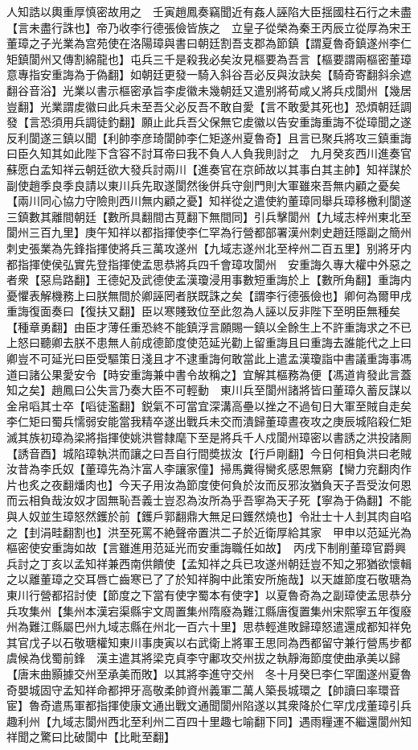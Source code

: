 人知誥以輿重厚慎密故用之　壬寅趙鳳奏竊聞近有姦人誣陷大臣揺國柱石行之未盡【言未盡行誅也】帝乃收李行德張儉皆族之　立皇子從榮為秦王丙辰立從厚為宋王　董璋之子光業為宫苑使在洛陽璋與書曰朝廷割吾支郡為節鎮【謂夏魯奇鎮遂州李仁矩鎮閬州又傳割綿龍也】屯兵三千是殺我必矣汝見樞要為吾言【樞要謂兩樞密董璋意專指安重誨為于偽翻】如朝廷更發一騎入斜谷吾必反與汝訣矣【騎奇寄翻斜余遮翻谷音浴】光業以書示樞密承旨李䖍徽未幾朝廷又遣别將荀咸乂將兵戍閬州【幾居豈翻】光業謂䖍徽曰此兵未至吾父必反吾不敢自愛【言不敢愛其死也】恐煩朝廷調發【言恐須用兵調徒釣翻】願止此兵吾父保無它䖍徽以告安重誨重誨不從璋聞之遂反利閬遂三鎮以聞【利帥李彦琦閬帥李仁矩遂州夏魯奇】且言已聚兵將攻三鎮重誨曰臣久知其如此陛下含容不討耳帝曰我不負人人負我則討之　九月癸亥西川進奏官蘇愿白孟知祥云朝廷欲大發兵討兩川【進奏官在京師故以其事白其主帥】知祥謀於副使趙季良季良請以東川兵先取遂閬然後併兵守劍門則大軍雖來吾無内顧之憂矣【兩川同心協力守險則西川無内顧之憂】知祥從之遣使約董璋同舉兵璋移檄利閬遂三鎮數其離間朝廷【數所具翻間古莧翻下無間同】引兵擊閬州【九域志梓州東北至閬州三百九里】庚午知祥以都指揮使李仁罕為行營都部署漢州刺史趙廷隱副之簡州刺史張業為先鋒指揮使將兵三萬攻遂州【九域志遂州北至梓州二百五里】别將牙内都指揮使侯弘實先登指揮使孟思恭將兵四千會璋攻閬州　安重誨久專大權中外惡之者衆【惡烏路翻】王德妃及武德使孟漢瓊浸用事數短重誨於上【數所角翻】重誨内憂懼表解機務上曰朕無間於卿誣罔者朕既誅之矣【謂李行德張儉也】卿何為爾甲戌重誨復面奏曰【復扶又翻】臣以寒賤致位至此忽為人誣以反非陛下至明臣無種矣【種章勇翻】由臣才薄任重恐終不能鎮浮言願賜一鎮以全餘生上不許重誨求之不已上怒曰聽卿去朕不患無人前成德節度使范延光勸上留重誨且曰重誨去誰能代之上曰卿豈不可延光曰臣受驅策日淺且才不逮重誨何敢當此上遣孟漢瓊詣中書議重誨事馮道曰諸公果愛安令【時安重誨兼中書令故稱之】宜解其樞務為便【馮道肯發此言蓋知之矣】趙鳳曰公失言乃奏大臣不可輕動　東川兵至閬州諸將皆曰董璋久蓄反謀以金帛㗖其士卒【㗖徒濫翻】鋭氣不可當宜深溝高壘以挫之不過旬日大軍至賊自走矣李仁矩曰蜀兵懦弱安能當我精卒遂出戰兵未交而潰歸董璋晝夜攻之庚辰城陷殺仁矩滅其族初璋為梁將指揮使姚洪嘗隸麾下至是將兵千人戍閬州璋密以書誘之洪投諸厠【誘音酉】城陷璋執洪而讓之曰吾自行間奬拔汝【行戶剛翻】今日何相負洪曰老賊汝昔為李氏奴【董璋先為汴富人李讓家僮】掃馬糞得臠炙感恩無窮【臠力兖翻肉作片也炙之夜翻燔肉也】今天子用汝為節度使何負於汝而反邪汝猶負天子吾受汝何恩而云相負哉汝奴才固無恥吾義士豈忍為汝所為乎吾寧為天子死【寧為于偽翻】不能與人奴並生璋怒然鑊於前【鑊戶郭翻鼎大無足曰鑊然燒也】令壯士十人刲其肉自啗之【刲涓畦翻割也】洪至死罵不絶聲帝置洪二子於近衛厚給其家　甲申以范延光為樞密使安重誨如故【言雖進用范延光而安重誨職任如故】　丙戌下制削董璋官爵興兵討之丁亥以孟知祥兼西南供饋使【孟知祥之兵已攻遂州朝廷豈不知之邪猶欲懷輯之以離董璋之交耳唇亡齒寒已了了於知祥胸中此策安所施哉】以天雄節度石敬瑭為東川行營都招討使【節度之下當有使字蜀本有使字】以夏魯奇為之副璋使孟思恭分兵攻集州【集州本漢宕渠縣宇文周置集州隋廢為難江縣唐復置集州宋熙寧五年復廢州為難江縣屬巴州九域志縣在州北一百六十里】思恭輕進敗歸璋怒遣還成都知祥免其官戊子以石敬瑭權知東川事庚寅以右武衛上將軍王思同為西都留守兼行營馬步都虞候為伐蜀前鋒　漢主遣其將梁克貞李守鄘攻交州拔之執靜海節度使曲承美以歸【唐末曲顥據交州至承美而敗】以其將李進守交州　冬十月癸巳李仁罕圍遂州夏魯奇嬰城固守孟知祥命都押牙高敬柔帥資州義軍二萬人築長城環之【帥讀曰率環音宦】魯奇遣馬軍都指揮使康文通出戰文通聞閬州陷遂以其衆降於仁罕戊戌董璋引兵趣利州【九域志閬州西北至利州二百四十里趣七喻翻下同】遇雨糧運不繼還閬州知祥聞之驚曰比破閬中【比毗至翻】